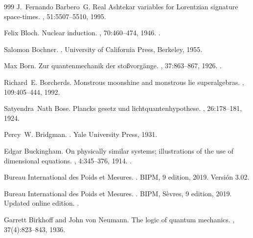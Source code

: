 \begin{thebibliography}{999}
J.~Fernando Barbero~G.
\newblock Real {Ashtekar} variables for {Lorentzian} signature space-times.
, 51:5507--5510, 1995.

Felix Bloch.
\newblock Nuclear induction.
, 70:460--474, 1946.
\newblock \href {https://doi.org/10.1103/PhysRev.70.460}
  {}.

Salomon Bochner.
.
\newblock University of California Press, Berkeley, 1955.

Max Born.
\newblock Zur quantenmechanik der sto{\ss}vorg{\"a}nge.
, 37:863--867, 1926.
\newblock \href {https://doi.org/10.1007/BF01397477}
  {}.

Richard~E. Borcherds.
\newblock Monstrous moonshine and monstrous lie superalgebras.
, 109:405--444, 1992.

Satyendra~Nath Bose.
\newblock Plancks gesetz und lichtquantenhypothese.
, 26:178--181, 1924.

Percy~W. Bridgman.
.
\newblock Yale University Press, 1931.

Edgar Buckingham.
\newblock On physically similar systems; illustrations of the use of
  dimensional equations.
, 4:345--376, 1914.
\newblock \href {https://doi.org/10.1103/PhysRev.4.345}
  {}.

{Bureau International des Poids et Mesures}.
.
\newblock BIPM, 9 edition, 2019.
\newblock Versi\'on 3.02.

{Bureau International des Poids et Mesures}.
.
\newblock BIPM, S\`evres, 9 edition, 2019.
\newblock Updated online edition.
\newblock \href {https://doi.org/10.59161/AUEZ1291}
  {}.

Garrett Birkhoff and John von Neumann.
\newblock The logic of quantum mechanics.
, 37(4):823--843, 1936.


\end{thebibliography}
